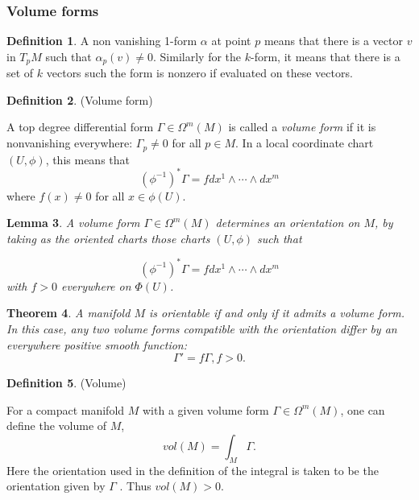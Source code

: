 \documentclass{article}
\newtheorem{theorem}{Theorem}[section]
\newtheorem{lemma}[theorem]{Lemma}
\theoremstyle{definition}
\newtheorem{defn}[theorem]{Definition}
\newenvironment{definition}
  {\vspace{8pt}\begin{mdframed}[backgroundcolor=blueish,innertopmargin=4]\begin{defn}}
  {\end{defn}\end{mdframed}\vspace{4pt}}
\begin{document}
\subsubsection{Volume forms}

\begin{definition}

A non vanishing 1-form $\alpha$ at point $p$ means that there is a vector $v$ in $T_pM$ such that $\alpha_p(v)\neq 0$. Similarly for the $k$-form, it means that there is a set of $k$ vectors such the form is nonzero if evaluated on these vectors.
\end{definition}

\begin{definition} (Volume form)

A top degree differential form $\Gamma \in \Omega^m(M)$ is called a \textit{volume form} if it is nonvanishing  everywhere: $\Gamma_p \neq 0$ for all $p \in M$. In a local coordinate chart $(U,\phi)$, this means that 
\[ (\phi^{-1} )^*\Gamma = f dx^1 \wedge \cdots \wedge dx^m 
\]
where $f(x) \neq 0$ for all $x \in  \phi(U)$.

\end{definition}


\begin{lemma}

A volume form $\Gamma \in \Omega^m(M)$ determines an orientation on $M$, by taking as the oriented charts those charts $(U,\phi)$ such that 

\[
    (\phi^{-1})^*\Gamma = f dx^1 \wedge \cdots \wedge dx^m
\]
with $f > 0$ everywhere on $\Phi(U)$.
\end{lemma}


\begin{theorem}

A manifold $M$ is orientable if and only if it admits a volume form. In this case, any two volume forms compatible with the orientation differ by an everywhere positive smooth function: 
\[
    \Gamma' = f \Gamma , f > 0.
\]

\end{theorem}

\begin{definition} (Volume)

For a compact manifold $M$ with a given volume form $\Gamma \in \Omega^m(M)$, one can define the volume of $M$, 
\[
vol(M) = \int_M \Gamma.
\]
Here the orientation used in the definition of the integral is taken to be the orientation given by $\Gamma$ . Thus $vol(M) > 0$.
\end{definition}
\end{document}
